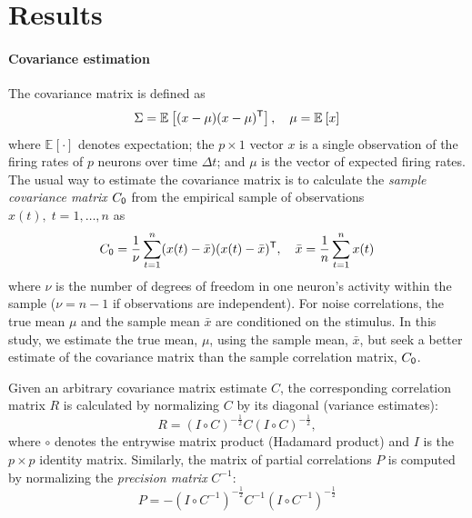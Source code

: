 \documentclass[10pt]{article}
\newcommand{\T}{{\sf T}}
\newcommand{\E}[2][]{\mathbb E_{#1}\left[ #2\right]}    %
\begin{document}
\section*{Results}
\paragraph{Covariance estimation}
The covariance matrix is defined as
\begin{equation}\label{eq:true-covariance}
    \Sigma = \E{(x-\mu)(x-\mu)^\T},\quad \mu = \E{x}
\end{equation}
where $\E{\cdot}$ denotes expectation; the $p\times 1$ vector $x$ is a single observation of the firing rates of $p$ neurons over time $\Delta t$; and $\mu$ is the vector of expected firing rates.  The usual way to estimate the covariance matrix is to calculate the \emph{sample covariance matrix} $C_{\sf 0}$ from the empirical sample of observations $x(t),\; t=1,\ldots,n$ as
\begin{equation}\label{eq:sample}
    C_{\sf 0} = \frac 1 \nu \sum\limits_{t=1}^n (x(t)-\bar x)(x(t)-\bar x)^\T,\quad \bar x= \frac 1 n \sum\limits_{t=1}^n x(t)
\end{equation}
where $\nu$ is the number of degrees of freedom in one neuron's activity within the sample ($\nu=n-1$ if observations are independent). For noise correlations, the true mean $\mu$ and the sample mean $\bar x$ are conditioned on the stimulus. In this study, we estimate the true mean, $\mu$, using the sample mean, $\bar x$, but seek a better estimate of the covariance matrix than the sample correlation matrix, $C_{\sf 0}$.  

Given an arbitrary covariance matrix estimate $C$, the corresponding correlation matrix $R$ is calculated by normalizing $C$ by its diagonal (variance estimates):
\begin{equation}\label{eq:precision}
    R = \left(I\circ C\right)^{-\frac 1 2} C \left(I\circ C\right)^{-\frac 1 2},
\end{equation}
where $\circ$ denotes the entrywise matrix product (Hadamard product) and $I$ is the $p\times p$ identity matrix. 
Similarly, the matrix of partial correlations $P$ is computed by normalizing the \emph{precision matrix} $C^{-1}$:
\begin{equation}\label{eq:partial}
    P = -\left(I\circ C^{-1}\right)^{-\frac 1 2} C^{-1} \left(I\circ C^{-1}\right)^{-\frac 1 2}
\end{equation}
\end{document}
